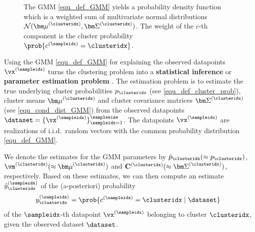 \documentclass[12pt]{report}
\newcommand{\boundellipse}[3]%
{(#1) ellipse (#2 and #3)
}
\begin{document}
\begin{figure}
\begin{center}
\end{center}
\label{fig_GMM_elippses}
\caption{The GMM \eqref{equ_def_GMM} yields a probability 
	density function which is a weighted sum of multivariate 
	normal distributions $\mathcal{N}({\bm \mu}^{(\clusteridx)}, {\bm \Sigma}^{(\clusteridx)})$. 
    The weight of the $c$-th component is the cluster probability 
    $ \prob{c^{(\sampleidx)}=\clusteridx}$.}
\end{figure}

Using the GMM \eqref{equ_def_GMM} for explaining the observed 
datapoints $\vx^{(\sampleidx)}$ turns the clustering problem into 
a {\bf statistical inference} or {\bf parameter estimation problem} \cite{kay,LC}. 
The estimation problem is to estimate the true underlying cluster 
probabilities $p_{\clusteridx}$ (see \eqref{equ_def_cluster_prob}), cluster 
means ${\bm \mu}^{(\clusteridx)}$ and cluster covariance matrices 
${\bm \Sigma}^{(\clusteridx)}$ (see \eqref{equ_cond_dist_GMM}) from 
the observed datapoints $\dataset = \{ \vx^{(\sampleidx)} \}_{\sampleidx=1}^{\samplesize}$. 
The datapoints $\vx^{(\sampleidx)}$ are realizations of i.i.d.\ random vectors with 
the common probability distribution \eqref{equ_def_GMM}. 

We denote the estimates for the GMM parameters by $\hat{p}_{\clusteridx} (\approx p_{\clusteridx})$, $\vm^{(\clusteridx)} (\approx {\bm \mu}^{(\clusteridx)})$ and 
$\mathbf{C}^{(\clusteridx)} (\approx {\bm \Sigma}^{(\clusteridx)})$, respectively. 
Based on these estimates, we can then compute an estimate $\hat{y}_{\clusteridx}^{(\sampleidx)}$ 
of the (a-posteriori) probability 
\begin{equation} 
y_{\clusteridx}^{(\sampleidx)} = \prob{c^{(\sampleidx)} = \clusteridx \mid \dataset }
\end{equation} 
of the $\sampleidx$-th datapoint $\vx^{(\sampleidx)}$ belonging 
to cluster $\clusteridx$, given the observed dataset $\dataset$. 
\end{document}
